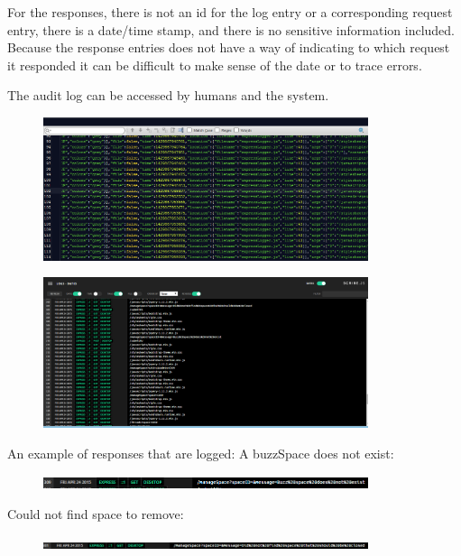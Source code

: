 \documentclass[hidelinks, 12pt, oneside]{article}
\begin{document}
\begin{enumerate}
For the responses, there is not an id for the log entry or a corresponding request entry, there is a date/time stamp, and there is no sensitive information included. Because the response entries does not have a way of indicating to which request it responded it can be difficult to make sense of the date or to trace errors.

The audit log can be accessed by humans and the system. 


\begin{figure}[h!]
  \centering
    \includegraphics[width=0.85\textwidth]{logFile} 
\end{figure}

\begin{figure}[h!]
  \centering
    \includegraphics[width=0.85\textwidth]{logs} 
\end{figure}

An example of responses that are logged:
A buzzSpace does not exist:

\begin{figure}[h!]
  \centering
    \includegraphics[width=0.85\textwidth]{buzzNotExistLog} 
\end{figure}

Could not find space to remove:

\begin{figure}[h!]
  \centering
    \includegraphics[width=0.85\textwidth]{couldNotFindSpaceLog} 
\end{figure}


\end{enumerate}
\end{document}
